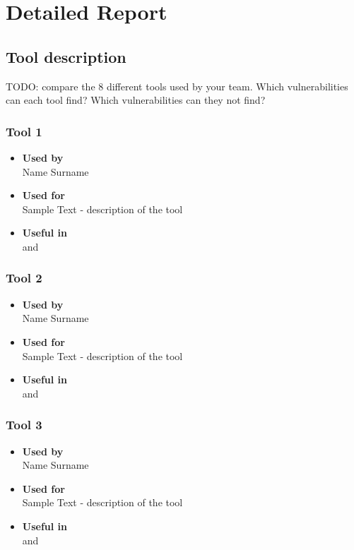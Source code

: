 \chapter{Detailed Report}\label{chapter:detailed_report}

\section{Tool description}

TODO:\newline
compare the 8 different tools used by your team. Which vulnerabilities can each
tool find? Which vulnerabilities can they not find?\newline

\subsection*{Tool 1}
\begin{itemize}
	\item \textbf{Used by}\\ Name Surname
	\item \textbf{Used for}\\ Sample Text - description of the tool
	\item \textbf{Useful in}\\  and 
\end{itemize}

\subsection*{Tool 2}
\begin{itemize}
	\item \textbf{Used by}\\ Name Surname
	\item \textbf{Used for}\\ Sample Text - description of the tool
	\item \textbf{Useful in}\\  and 
\end{itemize}

\subsection*{Tool 3}
\begin{itemize}
	\item \textbf{Used by}\\ Name Surname
	\item \textbf{Used for}\\ Sample Text - description of the tool
	\item \textbf{Useful in}\\  and 
\end{itemize}

